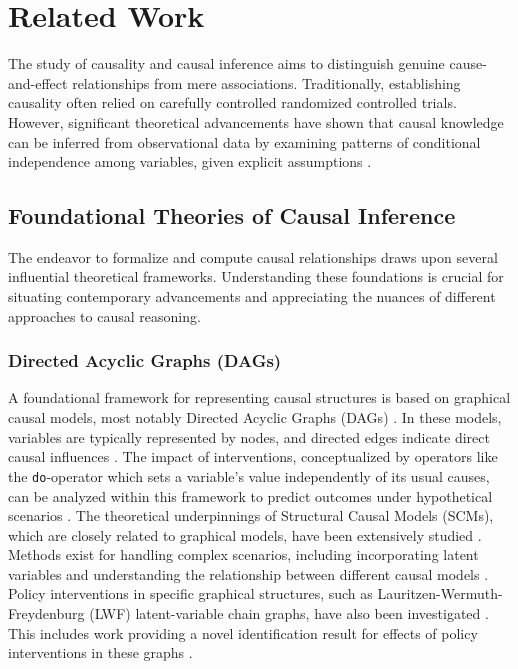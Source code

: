 \section{Related Work}
\label{sec:related_work}

The study of causality and causal inference aims to distinguish genuine cause-and-effect relationships from mere associations. Traditionally, establishing causality often relied on carefully controlled randomized controlled trials. However, significant theoretical advancements have shown that causal knowledge can be inferred from observational data by examining patterns of conditional independence among variables, given explicit assumptions \cite{pearl2018theoretical}.



\subsection{Foundational Theories of Causal Inference}
\label{subsec:foundational_theories}

The endeavor to formalize and compute causal relationships draws upon several influential theoretical frameworks. Understanding these foundations is crucial for situating contemporary advancements and appreciating the nuances of different approaches to causal reasoning.

\subsubsection{Directed Acyclic Graphs (DAGs)}

A foundational framework for representing causal structures is based on graphical causal models, most notably Directed Acyclic Graphs (DAGs) \cite{verma1986causal, pearl1988probabilistic, Glymour2019Review, koller2009probabilistic}. In these models, variables are typically represented by nodes, and directed edges indicate direct causal influences \cite{pearl1988probabilistic}. The impact of interventions, conceptualized by operators like the \texttt{do}-operator which sets a variable's value independently of its usual causes, can be analyzed within this framework to predict outcomes under hypothetical scenarios \cite{pearl1988probabilistic, Pearl2009Causality}. The theoretical underpinnings of Structural Causal Models (SCMs), which are closely related to graphical models, have been extensively studied \cite{pearl2000causality, Peters2017Elements, bareinboim2020causal, janzing2016algorithmic, Peters2022Causal}. Methods exist for handling complex scenarios, including incorporating latent variables \cite{Mohan2021Graphical, richardson2003causal} and understanding the relationship between different causal models \cite{Verma1990Equivalence, pearl2018theoretical}. Policy interventions in specific graphical structures, such as Lauritzen-Wermuth-Freydenburg (LWF) latent-variable chain graphs, have also been investigated \cite{sherman2020general}. This includes work providing a novel identification result for effects of policy interventions in these graphs \cite{sherman2020general}.

